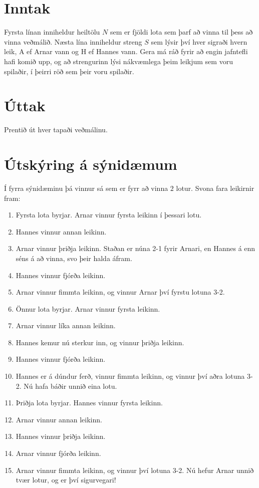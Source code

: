 \section*{Inntak}
Fyrsta línan inniheldur heiltölu $N$ sem er fjöldi lota sem þarf að vinna til 
þess að vinna veðmálið. Næsta lína inniheldur streng $S$ sem lýsir því hver
sigraði hvern leik, A ef Arnar vann og H ef Hannes vann. Gera má ráð fyrir að
engin jafntefli hafi komið upp, og að strengurinn lýsi nákvæmlega þeim leikjum
sem voru spilaðir, í þeirri röð sem þeir voru spilaðir.


\section*{Úttak}
Prentið út hver tapaði veðmálinu.

\section*{Útskýring á sýnidæmum}
Í fyrra sýnidæminu þá vinnur sá sem er fyrr að vinna $2$ lotur. Svona fara leikirnir fram:
\begin{enumerate}
    \item Fyrsta lota byrjar. Arnar vinnur fyrsta leikinn í þessari lotu.
    \item Hannes vinnur annan leikinn.
    \item Arnar vinnur þriðja leikinn. Staðan er núna 2-1 fyrir Arnari, en Hannes á enn séns á að vinna, svo þeir halda áfram.
    \item Hannes vinnur fjórða leikinn.
    \item Arnar vinnur fimmta leikinn, og vinnur Arnar því fyrstu lotuna 3-2.
    \item Önnur lota byrjar. Arnar vinnur fyrsta leikinn.
    \item Arnar vinnur líka annan leikinn.
    \item Hannes kemur nú sterkur inn, og vinnur þriðja leikinn.
    \item Hannes vinnur fjórða leikinn.
    \item Hannes er á dúndur ferð, vinnur fimmta leikinn, og vinnur því aðra lotuna 3-2. Nú hafa báðir unnið eina lotu.
    \item Þriðja lota byrjar. Hannes vinnur fyrsta leikinn.
    \item Arnar vinnur annan leikinn.
    \item Hannes vinnur þriðja leikinn.
    \item Arnar vinnur fjórða leikinn.
    \item Arnar vinnur fimmta leikinn, og vinnur því lotuna 3-2. Nú hefur Arnar unnið tvær lotur, og er því sigurvegari!
\end{enumerate}

